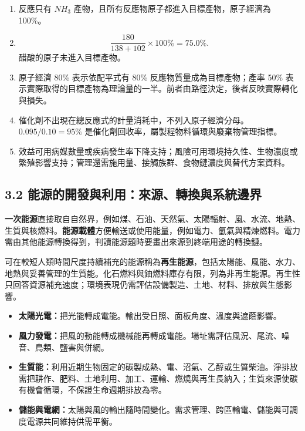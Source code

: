 \documentclass[11pt,a4paper]{article}
\providecommand{\tightlist}{%
  \setlength{\itemsep}{0pt}\setlength{\parskip}{0pt}}
\begin{document}
\begin{enumerate}
\def\labelenumi{\arabic{enumi}.}
\tightlist
\item
  反應只有 \(NH_3\) 產物，且所有反應物原子都進入目標產物，原子經濟為 100\%。
\item
  \[\frac{180}{138+102}\times100\%=75.0\%.\] 醋酸的原子未進入目標產物。
\item
  原子經濟 80\% 表示依配平式有 80\% 反應物質量成為目標產物；產率 50\% 表示實際取得的目標產物為理論量的一半。前者由路徑決定，後者反映實際轉化與損失。
\item
  催化劑不出現在總反應式的計量消耗中，不列入原子經濟分母。\(0.095/0.10=95\%\) 是催化劑回收率，屬製程物料循環與廢棄物管理指標。
\item
  效益可用病媒數量或疾病發生率下降支持；風險可用環境持久性、生物濃度或繁殖影響支持；管理還需施用量、接觸族群、食物鏈濃度與替代方案資料。
\end{enumerate}

\subsection{3.2 能源的開發與利用：來源、轉換與系統邊界}\label{ux80fdux6e90ux7684ux958bux767cux8207ux5229ux7528ux4f86ux6e90ux8f49ux63dbux8207ux7cfbux7d71ux908aux754c}

\textbf{一次能源}直接取自自然界，例如煤、石油、天然氣、太陽輻射、風、水流、地熱、生質與核燃料。\textbf{能源載體}方便輸送或使用能量，例如電力、氫氣與精煉燃料。電力需由其他能源轉換得到，判讀能源題時要畫出來源到終端用途的轉換鏈。

可在較短人類時間尺度持續補充的能源稱為\textbf{再生能源}，包括太陽能、風能、水力、地熱與妥善管理的生質能。化石燃料與鈾燃料庫存有限，列為非再生能源。再生性只回答資源補充速度；環境表現仍需評估設備製造、土地、材料、排放與生態影響。

\begin{itemize}
\tightlist
\item
  \textbf{太陽光電：}把光能轉成電能。輸出受日照、面板角度、溫度與遮蔭影響。
\item
  \textbf{風力發電：}把風的動能轉成機械能再轉成電能。場址需評估風況、尾流、噪音、鳥類、鹽害與併網。
\item
  \textbf{生質能：}利用近期生物固定的碳製成熱、電、沼氣、乙醇或生質柴油。淨排放需把耕作、肥料、土地利用、加工、運輸、燃燒與再生長納入；生質來源使碳有機會循環，不保證生命週期排放為零。
\item
  \textbf{儲能與電網：}太陽與風的輸出隨時間變化。需求管理、跨區輸電、儲能與可調度電源共同維持供需平衡。
\end{itemize}
\end{document}
